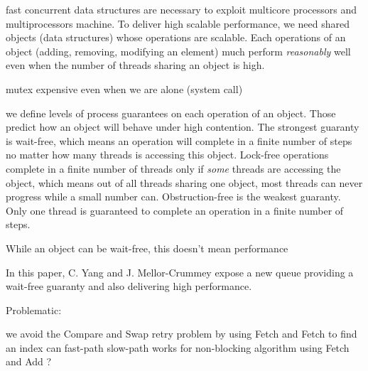 fast concurrent data structures are necessary to exploit multicore processors and
multiprocessors machine. To deliver high scalable performance, we need shared
objects (data structures) whose operations are scalable. Each operations of an
object (adding, removing, modifying an element) much perform \textit{reasonably}
well even when the number of threads sharing an object is high.

mutex expensive even when we are alone (system call)

we define levels of process guarantees on each operation of an object. Those
predict how an object will behave under high contention. The strongest guaranty
is wait-free, which means an operation will complete in a finite number of steps
no matter how many threads is accessing this object. Lock-free operations
complete in a finite number of threads only if \textit{some} threads are
accessing the object, which means out of all threads sharing one object, most
threads can never progress while a small number can. Obstruction-free is the
weakest guaranty. Only one thread is guaranteed to complete an operation in a
finite number of steps.

While an object can be wait-free, this doesn't mean performance

In this paper, C. Yang and J. Mellor-Crummey expose a new queue providing a
wait-free guaranty and also delivering high performance.



Problematic:

we avoid the Compare and Swap retry problem by using Fetch and Fetch to find an index
can fast-path slow-path works for non-blocking algorithm using Fetch and Add ?
